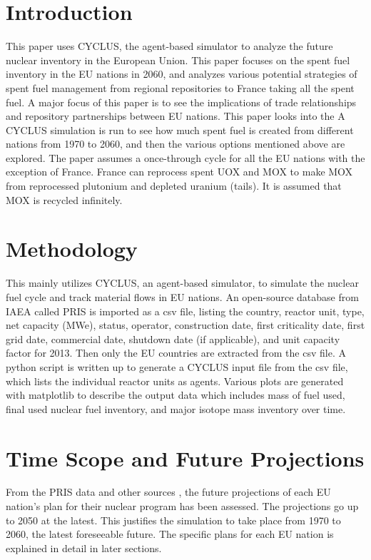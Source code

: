 \section{Introduction}
This paper uses CYCLUS, the agent-based simulator \cite{huff_fundamental_2016} to analyze
the future nuclear inventory in the European Union. This paper focuses on the spent fuel
inventory in the EU nations in 2060, and analyzes various potential strategies of spent fuel
management from regional
repositories to France taking all the spent fuel.
A major focus of this paper is to see the implications of trade
relationships and repository partnerships between EU nations.
This paper looks into the  A CYCLUS simulation is run to see
how much spent fuel is created from different nations from 1970 to 2060, and then the various
options mentioned above are explored.  The paper assumes a once-through cycle for all the 
EU nations with the exception of France. France can reprocess spent \gls{UOX} and \gls{MOX} to
make \gls{MOX} from reprocessed plutonium and depleted uranium (tails). It is assumed that
\gls{MOX} is recycled infinitely. 


\section{Methodology}
This mainly utilizes CYCLUS, an agent-based simulator, to simulate the nuclear fuel cycle
and track material flows in EU nations. An open-source database from \gls{IAEA} called
\gls{PRIS} is imported as a csv file, listing the country, reactor unit, type, net capacity (MWe), status,
operator, construction date, first criticality date, first grid date, commercial date, shutdown
date (if applicable), and unit capacity factor for 2013. Then only the EU countries are extracted
from the csv file. A python script is written up to generate a CYCLUS input file from the csv file,
which lists the individual reactor units as agents. Various plots are 
generated with matplotlib to describe the output data which includes mass of fuel used, final used nuclear fuel
inventory, and major isotope mass inventory over time.


\section{Time Scope and Future Projections}
From the \gls{PRIS} data and other sources \cite{world_nuclear_2017} \cite{joskow_future_2012} \cite{hatch_politics_2013},
the future projections of each EU nation's plan for their nuclear program has been assessed.
The projections go up to 2050 at the latest. This justifies the simulation to take place from
1970 to 2060, the latest foreseeable future. The specific plans for each EU nation is explained
in detail in later sections.


